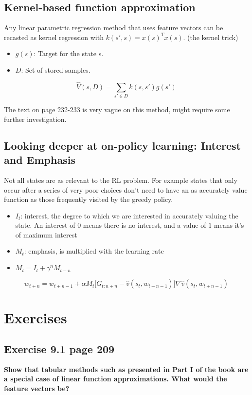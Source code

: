 \subsection{Kernel-based function approximation}
Any linear parametric regression method that uses feature vectors can be recasted as kernel regression with $k(s',s)=x(s)^Tx(s)$. (the kernel trick)
\begin{itemize}
	\item $g(s)$: Target for the state s.
	\item $D$: Set of stored samples.
\end{itemize}

\begin{equation}
\hat{V}(s, D) = \sum_{s' \in D} k(s, s')g(s')
\end{equation}

The text on page 232-233 is very vague on this method, might require some further investigation.

\subsection{Looking deeper at on-policy learning: Interest and Emphasis}
Not all states are as relevant to the RL problem. For example states that only occur after a series of very poor choices don't need to have an as accurately value function as those frequently visited by the greedy policy.

\begin{itemize}
	\item $I_t$: interest, the degree to which we are interested in accurately valuing the state. An interest of $0$ means there is no interest, and a value of $1$ means it's of maximum interest
	\item $M_t$: emphasis, is multiplied with the learning rate
	\item $M_t = I_t + \gamma^nM_{t-n}$
\end{itemize}

\begin{equation}
w_{t+n} = w_{t+n-1} + \alpha M_t\big[ G_{t:n+n} - \hat{v}(s_t, w_{t+n-1}) \big] \nabla \hat{v}(s_t, w_{t+n-1})
\end{equation}

\section{Exercises}
\subsection{Exercise 9.1 page 209}
\textbf{Show that tabular methods such as presented in Part I of the book are a special case of linear function approximations. What would the feature vectors be?}


